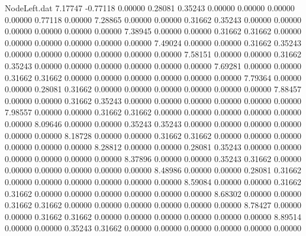 \begin{filecontents}{NodeLeft.dat}
   7.17747   -0.77118    0.00000     0.28081    0.35243    0.00000    0.00000    0.00000    0.00000    0.77118    0.00000
   7.28865    0.00000    0.00000     0.31662    0.35243    0.00000    0.00000    0.00000    0.00000    0.00000    0.00000
   7.38945    0.00000    0.00000     0.31662    0.31662    0.00000    0.00000    0.00000    0.00000    0.00000    0.00000
   7.49024    0.00000    0.00000     0.31662    0.35243    0.00000    0.00000    0.00000    0.00000    0.00000    0.00000
   7.58151    0.00000    0.00000     0.31662    0.35243    0.00000    0.00000    0.00000    0.00000    0.00000    0.00000
   7.69281    0.00000    0.00000     0.31662    0.31662    0.00000    0.00000    0.00000    0.00000    0.00000    0.00000
   7.79364    0.00000    0.00000     0.28081    0.31662    0.00000    0.00000    0.00000    0.00000    0.00000    0.00000
   7.88457    0.00000    0.00000     0.31662    0.35243    0.00000    0.00000    0.00000    0.00000    0.00000    0.00000
   7.98557    0.00000    0.00000     0.31662    0.31662    0.00000    0.00000    0.00000    0.00000    0.00000    0.00000
   8.09646    0.00000    0.00000     0.35243    0.35243    0.00000    0.00000    0.00000    0.00000    0.00000    0.00000
   8.18728    0.00000    0.00000     0.31662    0.31662    0.00000    0.00000    0.00000    0.00000    0.00000    0.00000
   8.28812    0.00000    0.00000     0.28081    0.35243    0.00000    0.00000    0.00000    0.00000    0.00000    0.00000
   8.37896    0.00000    0.00000     0.35243    0.31662    0.00000    0.00000    0.00000    0.00000    0.00000    0.00000
   8.48986    0.00000    0.00000     0.28081    0.31662    0.00000    0.00000    0.00000    0.00000    0.00000    0.00000
   8.59084    0.00000    0.00000     0.31662    0.31662    0.00000    0.00000    0.00000    0.00000    0.00000    0.00000
   8.68302    0.00000    0.00000     0.31662    0.31662    0.00000    0.00000    0.00000    0.00000    0.00000    0.00000
   8.78427    0.00000    0.00000     0.31662    0.31662    0.00000    0.00000    0.00000    0.00000    0.00000    0.00000
   8.89514    0.00000    0.00000     0.35243    0.31662    0.00000    0.00000    0.00000    0.00000    0.00000    0.00000
\end{filecontents}
